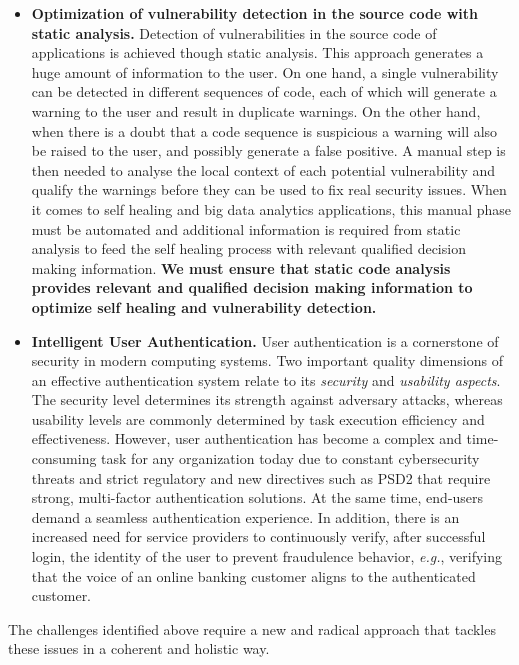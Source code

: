 \documentclass[a4paper,11pt]{article}
\begin{document}
\begin{itemize}
\item {\textbf{Optimization of vulnerability detection in the source code with static analysis.}} Detection of vulnerabilities in the source code of applications is achieved though static analysis. This approach generates a huge amount of information to the user. On one hand, a single vulnerability can be detected in different sequences of code, each of which will generate a warning to the user and result in duplicate warnings. On the other hand, when there is a doubt that a code sequence is suspicious a warning will also be raised to the user, and possibly generate a false positive. A manual step is then needed to analyse the local context of each potential vulnerability and qualify the warnings before they can be used to fix real security issues. When it comes to self healing and big data analytics applications, this manual phase must be automated and additional information is required from static analysis to feed the self healing process with relevant qualified decision making information.
\textbf{We must ensure that static code analysis provides relevant and qualified decision making information to optimize self healing and vulnerability detection.} 

\item \textbf{Intelligent User Authentication.} 
User authentication is a cornerstone of security in modern computing systems. Two important quality dimensions of an effective authentication system relate to its \textit{security} and \textit{usability aspects}. The security level determines its strength against adversary attacks, whereas usability levels are commonly determined by task execution efficiency and effectiveness. However, user authentication has become a complex and time-consuming task for any organization today due to constant cybersecurity threats and strict regulatory and new directives such as PSD2 that require strong, multi-factor authentication solutions. At the same time, end-users demand a seamless authentication experience. In addition, there is an increased need for service providers to continuously verify, after successful login, the identity of the user to prevent fraudulence behavior, \textit{e.g.}, verifying that the voice of an online banking customer aligns to the authenticated customer. 


\end{itemize}


The challenges identified above require a new and radical
approach that tackles these issues in a coherent and
holistic way. 
\end{document}
